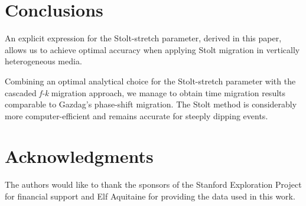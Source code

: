 


\section{Conclusions}

An explicit expression for the Stolt-stretch parameter, derived in this
paper, allows us to achieve optimal accuracy when applying Stolt
migration in vertically heterogeneous media.

Combining an optimal analytical choice for the Stolt-stretch parameter
with the cascaded {\it f-k} migration approach, we manage to obtain
time migration results comparable to Gazdag's phase-shift migration.
The Stolt method is considerably more computer-efficient and remains
accurate for steeply dipping events.

\section{Acknowledgments}

The authors would like to thank the sponsors of the Stanford
Exploration Project for financial support and Elf Aquitaine for
providing the data used in this work.




\append{\ }

